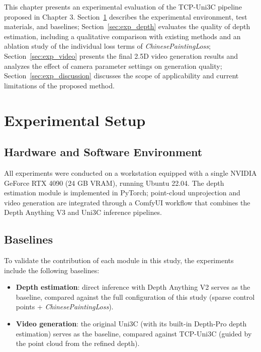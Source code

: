 \hspace{24pt}

This chapter presents an experimental evaluation of the TCP-Uni3C pipeline proposed in Chapter 3.
Section~\ref{sec:exp_setup} describes the experimental environment, test materials, and baselines;
Section~\ref{sec:exp_depth} evaluates the quality of depth estimation,
including a qualitative comparison with existing methods and an ablation study of the individual loss terms of \textit{ChinesePaintingLoss};
Section~\ref{sec:exp_video} presents the final 2.5D video generation results
and analyzes the effect of camera parameter settings on generation quality;
Section~\ref{sec:exp_discussion} discusses the scope of applicability and current limitations of the proposed method.

\section{Experimental Setup}
\label{sec:exp_setup}

\subsection{Hardware and Software Environment}

All experiments were conducted on a workstation equipped with a single NVIDIA GeForce RTX 4090 (24 GB VRAM),
running Ubuntu 22.04.
The depth estimation module is implemented in PyTorch;
point-cloud unprojection and video generation are integrated through a ComfyUI workflow that combines the Depth Anything V3 and Uni3C inference pipelines.

\subsection{Baselines}

To validate the contribution of each module in this study, the experiments include the following baselines:

\begin{itemize}
  \item \textbf{Depth estimation}:
    direct inference with Depth Anything V2 serves as the baseline,
    compared against the full configuration of this study (sparse control points + \textit{ChinesePaintingLoss}).
  \item \textbf{Video generation}:
    the original Uni3C (with its built-in Depth-Pro depth estimation) serves as the baseline,
    compared against TCP-Uni3C (guided by the point cloud from the refined depth).
\end{itemize}

